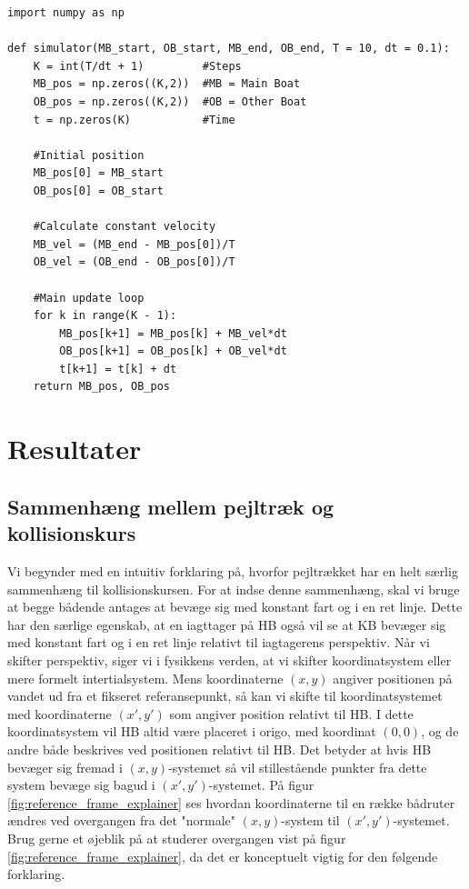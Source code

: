 \documentclass[%
 reprint,
nofootinbib,
aps,
]{revtex4-1}
\begin{document}
\begin{verbatim}
import numpy as np

def simulator(MB_start, OB_start, MB_end, OB_end, T = 10, dt = 0.1):
    K = int(T/dt + 1)         #Steps
    MB_pos = np.zeros((K,2))  #MB = Main Boat
    OB_pos = np.zeros((K,2))  #OB = Other Boat
    t = np.zeros(K)           #Time

    #Initial position
    MB_pos[0] = MB_start
    OB_pos[0] = OB_start

    #Calculate constant velocity
    MB_vel = (MB_end - MB_pos[0])/T
    OB_vel = (OB_end - OB_pos[0])/T

    #Main update loop
    for k in range(K - 1):
        MB_pos[k+1] = MB_pos[k] + MB_vel*dt
        OB_pos[k+1] = OB_pos[k] + OB_vel*dt
        t[k+1] = t[k] + dt
    return MB_pos, OB_pos
\end{verbatim}


\section{Resultater}
\subsection{Sammenhæng mellem pejltræk og kollisionskurs}
Vi begynder med en intuitiv forklaring på, hvorfor pejltrækket har en helt særlig sammenhæng til kollisionskursen. For at indse denne sammenhæng, skal vi bruge at begge bådende antages at bevæge sig med konstant fart og i en ret linje. Dette har den særlige egenskab, at en iagttager på HB også vil se at KB bevæger sig med konstant fart og i en ret linje relativt til iagtagerens perspektiv. Når vi skifter perspektiv, siger vi i fysikkens verden, at vi skifter koordinatsystem eller mere formelt intertialsystem. Mens koordinaterne $(x, y)$ angiver positionen på vandet ud fra et fikseret referansepunkt, så kan vi skifte til koordinatsystemet med koordinaterne $(x',y')$ som angiver position relativt til HB. I dette koordinatsystem vil HB altid være placeret i origo, med koordinat $(0,0)$, og de andre både beskrives ved positionen relativt til HB. Det betyder at hvis HB bevæger sig fremad i $(x,y)$-systemet så vil stillestående punkter fra dette system bevæge sig bagud i $(x',y')$-systemet. På figur \ref{fig:reference_frame_explainer} ses hvordan koordinaterne til en række bådruter ændres ved overgangen fra det "normale" $(x,y)$-system til $(x',y')$-systemet. Brug gerne et øjeblik på at studerer overgangen vist på figur \ref{fig:reference_frame_explainer}, da det er konceptuelt vigtig for den følgende forklaring.
\end{document}

